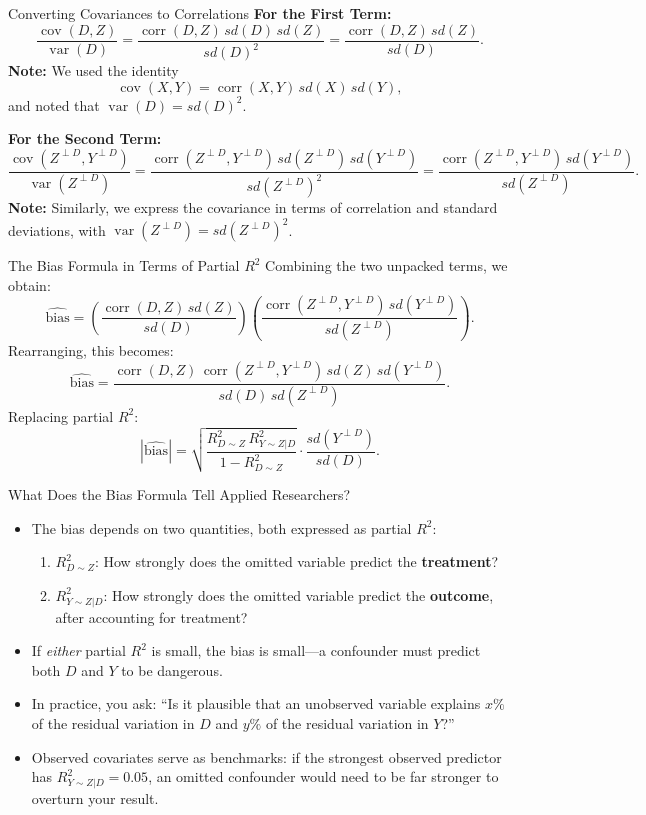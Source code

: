\documentclass[aspectratio=169, handout, t]{beamer}
\numberwithin{equation}{section}
\begin{document}
\begin{frame}{Converting Covariances to Correlations}
\vspace{-1ex}
\textbf{For the First Term:}
\[
\frac{\operatorname{cov}(D,Z)}{\operatorname{var}(D)} 
=\frac{\operatorname{corr}(D,Z)\,sd(D)\,sd(Z)}{sd(D)^2}
=\frac{\operatorname{corr}(D,Z)\,sd(Z)}{sd(D)}.
\]
\textbf{Note:}  
We used the identity
\[
\operatorname{cov}(X,Y)=\operatorname{corr}(X,Y)\,sd(X)\,sd(Y),
\]
and noted that \(\operatorname{var}(D)=sd(D)^2\).

\vspace{2ex}\pause
\textbf{For the Second Term:}
\[
\frac{\operatorname{cov}(Z^{\perp D},Y^{\perp D})}{\operatorname{var}(Z^{\perp D})}
=\frac{\operatorname{corr}(Z^{\perp D},Y^{\perp D})\,sd(Z^{\perp D})\,sd(Y^{\perp D})}{sd(Z^{\perp D})^2}
=\frac{\operatorname{corr}(Z^{\perp D},Y^{\perp D})\,sd(Y^{\perp D})}{sd(Z^{\perp D})}.
\]
\textbf{Note:}  
Similarly, we express the covariance in terms of correlation and standard deviations, with \(\operatorname{var}(Z^{\perp D})=sd(Z^{\perp D})^2\).
\end{frame}

\begin{frame}{The Bias Formula in Terms of Partial $R^2$}
Combining the two unpacked terms, we obtain:
\[
\widehat{\text{bias}} 
=\left(\frac{\operatorname{corr}(D,Z)\,sd(Z)}{sd(D)}\right)
\left(\frac{\operatorname{corr}(Z^{\perp D},Y^{\perp D})\,sd(Y^{\perp D})}{sd(Z^{\perp D})}\right).
\]
Rearranging, this becomes:
\[
\widehat{\text{bias}} = \frac{\operatorname{corr}(D,Z)\,\operatorname{corr}(Z^{\perp D},Y^{\perp D})\,sd(Z)\,sd(Y^{\perp D})}{sd(D)\,sd(Z^{\perp D})}.
\]
Replacing partial $R^2$:
\[
|\widehat{\text{bias}}| = \sqrt{\frac{R^2_{D\sim Z}\,R^2_{Y\sim Z|D}}{1 - R^2_{D\sim Z}}}\cdot\frac{sd(Y^{\perp D})}{sd(D)}.
\]
\end{frame}

\begin{frame}{What Does the Bias Formula Tell Applied Researchers?}
\begin{itemize}
\item The bias depends on two quantities, both expressed as partial $R^2$:
\begin{enumerate}
\item $R^2_{D\sim Z}$: How strongly does the omitted variable predict the \textbf{treatment}?
\item $R^2_{Y\sim Z|D}$: How strongly does the omitted variable predict the \textbf{outcome}, after accounting for treatment?
\end{enumerate}\pause
\item If \emph{either} partial $R^2$ is small, the bias is small---a confounder must predict both $D$ and $Y$ to be dangerous.\pause
\item In practice, you ask: ``Is it plausible that an unobserved variable explains $x\%$ of the residual variation in $D$ and $y\%$ of the residual variation in $Y$?''
\item Observed covariates serve as benchmarks: if the strongest observed predictor has $R^2_{Y\sim Z|D}=0.05$, an omitted confounder would need to be far stronger to overturn your result.
\end{itemize}
\end{frame}
\end{document}
